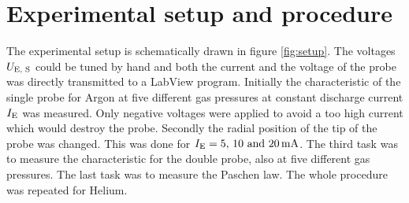\section{Experimental setup and procedure}\label{sec:versuchsaufbau}

The experimental setup is schematically drawn in figure \ref{fig:setup}. The voltages $U_{\text{\scriptsize E, S}}$ could be tuned by hand and both the current and the voltage of the probe was directly transmitted to a LabView program. Initially the characteristic of the single probe for Argon at five different gas pressures at constant discharge current $I_{\text{\scriptsize E}}$ was measured. Only negative voltages were applied to avoid a too high current which would destroy the probe. Secondly the radial position of the tip of the probe was changed. This was done for $\subsc{I}{E} = \unit[5, \, 10 \text{ and } 20]{mA}$. The third task was to measure the characteristic for the double probe, also at five different gas pressures. The last task was to measure the Paschen law. The whole procedure was repeated for Helium.